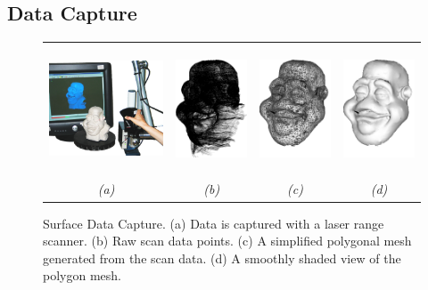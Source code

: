 \subsection{\label{sec:scandata:creation:capture}Data Capture}
\begin{figure}
\begin{center}
\begin{tabular}{cccc}
\includegraphics[height=3.8cm]{../images/modelmaker_dino} &
\includegraphics[height=3.8cm]{../images/scandata} &
\includegraphics[height=3.8cm]{../images/decimated_wireframe} &
\includegraphics[height=3.8cm]{../images/decimated_smoothshaded} \\
{\it(a)} & {\it(b)} & {\it(c)} & {\it(d)}
\end{tabular}
\caption[Surface Data Capture]{\label{fig:modelmaker} Surface Data Capture. (a) Data is captured with a laser range scanner. (b) Raw scan data points. (c) A simplified polygonal mesh generated from the scan data. (d) A smoothly shaded view of the polygon mesh.}
\end{center}
\end{figure}
